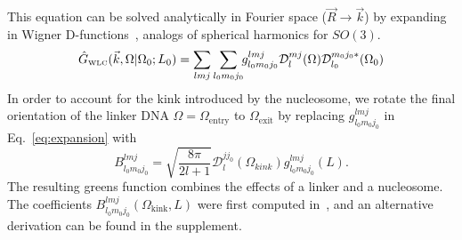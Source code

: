 \documentclass[%
 reprint,
superscriptaddress,
showpacs,preprintnumbers,
 amsmath,amssymb,
 aps,
 prl,
]{revtex4-1}
\newcommand{\ghat}[2][\Omega_0; L_0]{\hat{G}_\text{\tiny WLC}(#2|#1)}
\newcommand{\wigD}{\mathcal{D}}
\begin{document}
This equation can be solved analytically in Fourier space
    ($\vec{R} \rightarrow \vec{k}$) by expanding in Wigner
    D-functions~\cite{spakowitz2006}, analogs of spherical harmonics for
    $SO(3)$.
\begin{equation}\label{eq:expansion}
    \ghat{\vec{k}, \Omega} = \sum_{l m j}\sum_{l_0 m_0 j_0} \!\! g_{l_0 m_0 j_0}^{lmj}
        \wigD_l^{mj}(\Omega)\wigD_{l_0}^{m_0 j_0 *}(\Omega_0)
\end{equation}
In order to account for the kink introduced by the nucleosome, we rotate
    the final orientation of the linker DNA ${\Omega = \Omega_\text{entry}}$ to
    $\Omega_\text{exit}$ by replacing
    $g_{l_0 m_0 j_0}^{lmj}$ in Eq.~\ref{eq:expansion} with
    \begin{equation}\label{eq:coeffs}
        B_{l_{0}m_{0}j_{0}}^{lmj} = %
        \sqrt{\frac{8\pi}{2l+1}}
        \mathcal{D}_{l}^{jj_{0}}
        \left(\Omega_{kink}\right)g_{l_{0}m_{0}j_{0}}^{lmj}\left(L\right).
    \end{equation}
    The resulting greens function combines the effects of a linker and a
    nucleosome.
The coefficients $B_{l_0 m_0 j_0}^{lmj}(\Omega_\text{kink}, L)$ were first
    computed in~\cite{zhou2003}, and an alternative derivation can be found in
    the supplement.
\end{document}
